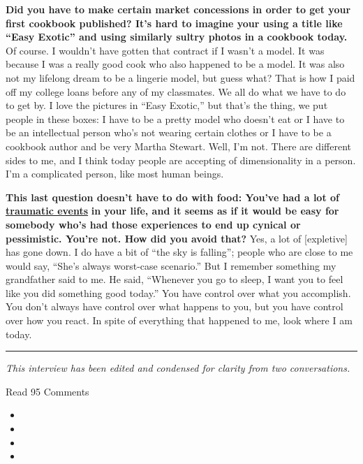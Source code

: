 \textbf{Did you have to make certain market concessions in order to get
your first cookbook published? It's hard to imagine your using a title
like ``Easy Exotic'' and using similarly sultry photos in a cookbook
today.} Of course. I wouldn't have gotten that contract if I wasn't a
model. It was because I was a really good cook who also happened to be a
model. It was also not my lifelong dream to be a lingerie model, but
guess what? That is how I paid off my college loans before any of my
classmates. We all do what we have to do to get by. I love the pictures
in ``Easy Exotic,'' but that's the thing, we put people in these boxes:
I have to be a pretty model who doesn't eat or I have to be an
intellectual person who's not wearing certain clothes or I have to be a
cookbook author and be very Martha Stewart. Well, I'm not. There are
different sides to me, and I think today people are accepting of
dimensionality in a person. I'm a complicated person, like most human
beings.

\textbf{This last question doesn't have to do with food: You've had a
lot of} \textbf{\href{http://nytimes.com\#tooltip-12}{traumatic events}}
\textbf{in your life, and it seems as if it would be easy for somebody
who's had those experiences to end up cynical or pessimistic. You're
not. How did you avoid that?} Yes, a lot of {[}expletive{]} has gone
down. I do have a bit of ``the sky is falling''; people who are close to
me would say, ``She's always worst-case scenario.'' But I remember
something my grandfather said to me. He said, ``Whenever you go to
sleep, I want you to feel like you did something good today.'' You have
control over what you accomplish. You don't always have control over
what happens to you, but you have control over how you react. In spite
of everything that happened to me, look where I am today.

\begin{center}\rule{0.5\linewidth}{\linethickness}\end{center}

\emph{This interview has been edited and condensed for clarity from two
conversations.}

Read 95 Comments

\begin{itemize}
\item
\item
\item
\item
\end{itemize}

